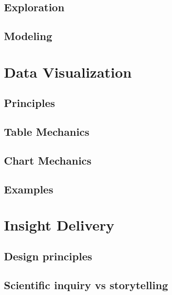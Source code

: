 \documentclass[
]{book}
\begin{document}
\hypertarget{exploration}{%
\section{Exploration}\label{exploration}}

\hypertarget{modeling}{%
\section{Modeling}\label{modeling}}

\hypertarget{data_viz}{%
\chapter{Data Visualization}\label{data_viz}}

\hypertarget{principles}{%
\section{Principles}\label{principles}}

\hypertarget{table-mechanics}{%
\section{Table Mechanics}\label{table-mechanics}}

\hypertarget{chart-mechanics}{%
\section{Chart Mechanics}\label{chart-mechanics}}

\hypertarget{examples}{%
\section{Examples}\label{examples}}

\hypertarget{insight_delivery}{%
\chapter{Insight Delivery}\label{insight_delivery}}

\hypertarget{design-principles}{%
\section{Design principles}\label{design-principles}}

\hypertarget{scientific-inquiry-vs-storytelling}{%
\section{Scientific inquiry vs storytelling}\label{scientific-inquiry-vs-storytelling}}
\end{document}
